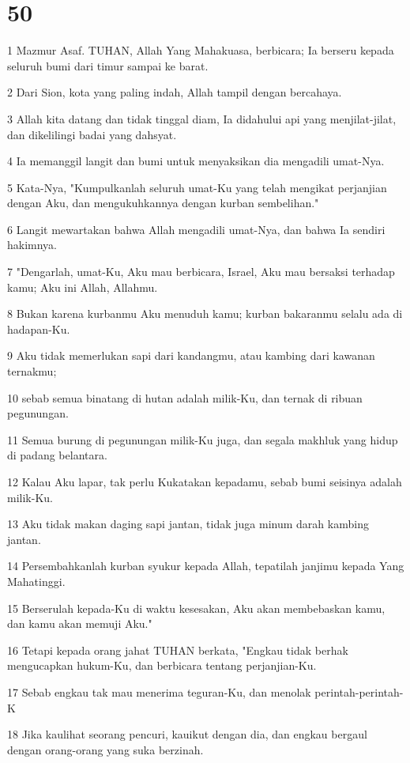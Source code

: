 \chapter{50}

\par 1 Mazmur Asaf. TUHAN, Allah Yang Mahakuasa, berbicara; Ia berseru kepada seluruh bumi dari timur sampai ke barat.
\par 2 Dari Sion, kota yang paling indah, Allah tampil dengan bercahaya.
\par 3 Allah kita datang dan tidak tinggal diam, Ia didahului api yang menjilat-jilat, dan dikelilingi badai yang dahsyat.
\par 4 Ia memanggil langit dan bumi untuk menyaksikan dia mengadili umat-Nya.
\par 5 Kata-Nya, "Kumpulkanlah seluruh umat-Ku yang telah mengikat perjanjian dengan Aku, dan mengukuhkannya dengan kurban sembelihan."
\par 6 Langit mewartakan bahwa Allah mengadili umat-Nya, dan bahwa Ia sendiri hakimnya.
\par 7 "Dengarlah, umat-Ku, Aku mau berbicara, Israel, Aku mau bersaksi terhadap kamu; Aku ini Allah, Allahmu.
\par 8 Bukan karena kurbanmu Aku menuduh kamu; kurban bakaranmu selalu ada di hadapan-Ku.
\par 9 Aku tidak memerlukan sapi dari kandangmu, atau kambing dari kawanan ternakmu;
\par 10 sebab semua binatang di hutan adalah milik-Ku, dan ternak di ribuan pegunungan.
\par 11 Semua burung di pegunungan milik-Ku juga, dan segala makhluk yang hidup di padang belantara.
\par 12 Kalau Aku lapar, tak perlu Kukatakan kepadamu, sebab bumi seisinya adalah milik-Ku.
\par 13 Aku tidak makan daging sapi jantan, tidak juga minum darah kambing jantan.
\par 14 Persembahkanlah kurban syukur kepada Allah, tepatilah janjimu kepada Yang Mahatinggi.
\par 15 Berserulah kepada-Ku di waktu kesesakan, Aku akan membebaskan kamu, dan kamu akan memuji Aku."
\par 16 Tetapi kepada orang jahat TUHAN berkata, "Engkau tidak berhak mengucapkan hukum-Ku, dan berbicara tentang perjanjian-Ku.
\par 17 Sebab engkau tak mau menerima teguran-Ku, dan menolak perintah-perintah-K
\par 18 Jika kaulihat seorang pencuri, kauikut dengan dia, dan engkau bergaul dengan orang-orang yang suka berzinah.
